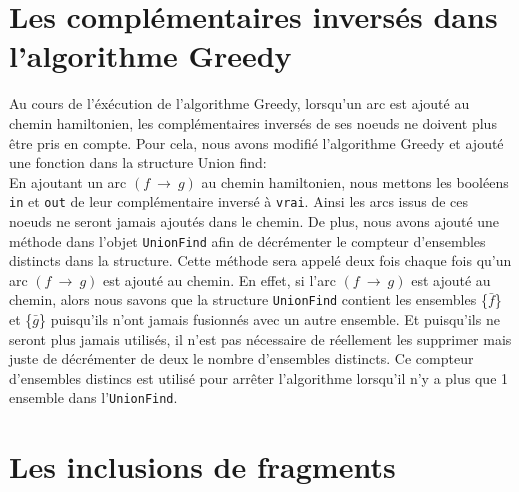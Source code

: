 \documentclass[a4paper, 12pt, titlepage]{article}
\newcommand{\arc}[2]{$\left(#1~\rightarrow~#2\right)$}
\begin{document}




\section{Les complémentaires inversés dans l'algorithme Greedy}%
Au cours de l'éxécution de l'algorithme Greedy, lorsqu'un arc est ajouté au chemin hamiltonien, les complémentaires inversés de ses noeuds ne doivent plus être pris en compte.
Pour cela, nous avons modifié l'algorithme Greedy et ajouté une fonction dans la structure Union find:\\
En ajoutant un arc \arc{f}{g} au chemin hamiltonien, nous mettons les booléens \texttt{in} et \texttt{out} de leur complémentaire inversé à \texttt{vrai}.
Ainsi les arcs issus de ces noeuds ne seront jamais ajoutés dans le chemin.
De plus, nous avons ajouté une méthode dans l'objet \texttt{UnionFind} afin de décrémenter le compteur d'ensembles distincts dans la structure.
Cette méthode sera appelé deux fois chaque fois qu'un arc \arc{f}{g} est ajouté au chemin.
En effet, si l'arc \arc{f}{g} est ajouté au chemin, alors nous savons que la structure \texttt{UnionFind} contient les ensembles \{$\bar{f}$\} et \{$\bar{g}$\} puisqu'ils n'ont jamais fusionnés avec un autre ensemble.
Et puisqu'ils ne seront plus jamais utilisés, il n'est pas nécessaire de réellement les supprimer mais juste de décrémenter de deux le nombre d'ensembles distincts.
Ce compteur d'ensembles distincs est utilisé pour arrêter l'algorithme lorsqu'il n'y a plus que 1 ensemble dans l'\texttt{UnionFind}.

\section{Les inclusions de fragments}%


\end{document}
